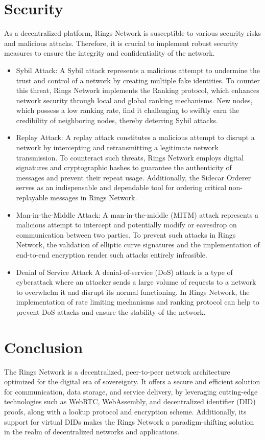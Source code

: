 \documentclass[twocolumn]{article}
\begin{document}
\section{Security}
As a decentralized platform, Rings Network is susceptible to various security risks and malicious attacks. Therefore, it is crucial to implement robust security measures to ensure the integrity and confidentiality of the network.
\begin{itemize}[itemsep=2pt,topsep=0pt,parsep=0pt]
\item Sybil Attack: A Sybil attack represents a malicious attempt to undermine the trust and control of a network by creating multiple fake identities. To counter this threat, Rings Network implements the Ranking protocol, which enhances network security through local and global ranking mechanisms. New nodes, which possess a low ranking rate, find it challenging to swiftly earn the credibility of neighboring nodes, thereby deterring Sybil attacks.

\item Replay Attack:
  A replay attack constitutes a malicious attempt to disrupt a network by intercepting and retransmitting a legitimate network transmission. To counteract such threats, Rings Network employs digital signatures and cryptographic hashes to guarantee the authenticity of messages and prevent their repeat usage. Additionally, the Sidecar Orderer serves as an indispensable and dependable tool for ordering critical non-replayable messages in Rings Network.

\item Man-in-the-Middle Attack:
  A man-in-the-middle (MITM) attack represents a malicious attempt to intercept and potentially modify or eavesdrop on communication between two parties. To prevent such attacks in Rings Network, the validation of elliptic curve signatures and the implementation of end-to-end encryption render such attacks entirely infeasible.

\item Denial of Service Attack
A denial-of-service (DoS) attack is a type of cyberattack where an attacker sends a large volume of requests to a network to overwhelm it and disrupt its normal functioning. In Rings Network, the implementation of rate limiting mechanisms and ranking protocol can help to prevent DoS attacks and ensure the stability of the network.
\end{itemize}

\section{Conclusion}
The Rings Network is a decentralized, peer-to-peer network architecture optimized for the digital era of sovereignty. It offers a secure and efficient solution for communication, data storage, and service delivery, by leveraging cutting-edge technologies such as WebRTC, WebAssembly, and decentralized identifier (DID) proofs, along with a lookup protocol and encryption scheme. Additionally, its support for virtual DIDs makes the Rings Network a paradigm-shifting solution in the realm of decentralized networks and applications.



\end{document}
